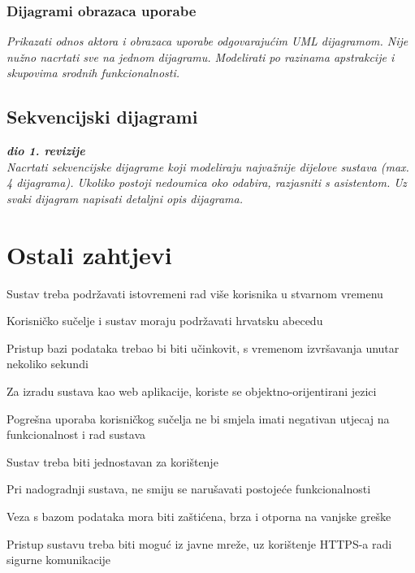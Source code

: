 					
				\subsubsection{Dijagrami obrazaca uporabe}
					
					\textit{Prikazati odnos aktora i obrazaca uporabe odgovarajućim UML dijagramom. Nije nužno nacrtati sve na jednom dijagramu. Modelirati po razinama apstrakcije i skupovima srodnih funkcionalnosti.}
				\eject		
				
			\subsection{Sekvencijski dijagrami}
				
				\textbf{\textit{dio 1. revizije}}\\
				
				\textit{Nacrtati sekvencijske dijagrame koji modeliraju najvažnije dijelove sustava (max. 4 dijagrama). Ukoliko postoji nedoumica oko odabira, razjasniti s asistentom. Uz svaki dijagram napisati detaljni opis dijagrama.}
				\eject
	
		\section{Ostali zahtjevi}

		\begin{packed_item}
			\item Sustav treba podržavati istovremeni rad više korisnika u stvarnom vremenu
			\item Korisničko sučelje i sustav moraju podržavati hrvatsku abecedu 
			\item Pristup bazi podataka trebao bi biti učinkovit, s vremenom izvršavanja unutar nekoliko sekundi
			\item Za izradu sustava kao web aplikacije, koriste se objektno-orijentirani jezici
			\item Pogrešna uporaba korisničkog sučelja ne bi smjela imati negativan utjecaj na funkcionalnost i rad sustava
			\item Sustav treba biti jednostavan za korištenje
			\item Pri nadogradnji sustava, ne smiju se narušavati postojeće funkcionalnosti
			\item Veza s bazom podataka mora biti zaštićena, brza i otporna na vanjske greške
			\item Pristup sustavu treba biti moguć iz javne mreže, uz korištenje HTTPS-a radi sigurne komunikacije
		\end{packed_item}
	